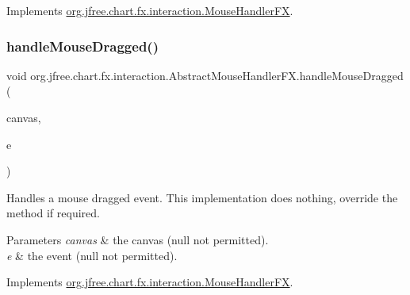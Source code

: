 Implements \mbox{\hyperlink{interfaceorg_1_1jfree_1_1chart_1_1fx_1_1interaction_1_1_mouse_handler_f_x_aa1761ee25681cfee7de718c887d4ae5e}{org.\+jfree.\+chart.\+fx.\+interaction.\+Mouse\+Handler\+FX}}.

\mbox{\label{classorg_1_1jfree_1_1chart_1_1fx_1_1interaction_1_1_abstract_mouse_handler_f_x_a467c9af78e00bda4799b151328d84c9e}} 
\subsubsection{\texorpdfstring{handle\+Mouse\+Dragged()}{handleMouseDragged()}}
{\footnotesize\ttfamily void org.\+jfree.\+chart.\+fx.\+interaction.\+Abstract\+Mouse\+Handler\+F\+X.\+handle\+Mouse\+Dragged (\begin{DoxyParamCaption}\item[{\mbox{\hyperlink{classorg_1_1jfree_1_1chart_1_1fx_1_1_chart_canvas}{Chart\+Canvas}}}]{canvas,  }\item[{Mouse\+Event}]{e }\end{DoxyParamCaption})}

Handles a mouse dragged event. This implementation does nothing, override the method if required.


\begin{DoxyParams}{Parameters}
{\em canvas} & the canvas ({\ttfamily null} not permitted). \\
\hline
{\em e} & the event ({\ttfamily null} not permitted). \\
\hline
\end{DoxyParams}


Implements \mbox{\hyperlink{interfaceorg_1_1jfree_1_1chart_1_1fx_1_1interaction_1_1_mouse_handler_f_x_a06bbfd28b778bca8ef8caf90174e18f4}{org.\+jfree.\+chart.\+fx.\+interaction.\+Mouse\+Handler\+FX}}.

\mbox{\label{classorg_1_1jfree_1_1chart_1_1fx_1_1interaction_1_1_abstract_mouse_handler_f_x_a230992718e2106e928c8ea454d0d6a06}} 
